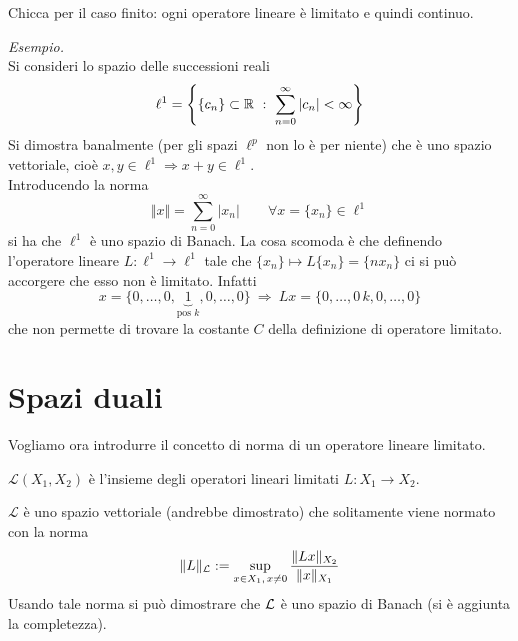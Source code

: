 Chicca per il caso finito: ogni operatore lineare è limitato e quindi continuo.

\textit{Esempio.}\\
Si consideri lo spazio delle successioni reali
\begin{equation*}
\ell^1=\left\{ \{c_n\}\subset \RR \ :\ \sum_{n=0}^{\infty}|c_n|<\infty\right\}
\end{equation*}
Si dimostra banalmente (per gli spazi $\ell^p$ non lo è per niente) che è uno spazio vettoriale, cioè $x,y\in\ell^1\Rightarrow x+y\in\ell^1$. \\
Introducendo la norma
\begin{equation*}
\Vert x \Vert =\sum_{n=0}^\infty |x_n| \qquad \forall x=\{x_n\}\in\ell^1
\end{equation*}
si ha che $\ell^1$ è uno spazio di Banach. La cosa scomoda è che definendo l'operatore lineare $L:\ell^1\to\ell^1$ tale che $\{x_n\}\mapsto L\{x_n\}=\{nx_n\}$ ci si può accorgere che esso non è limitato. Infatti
\begin{equation*}
x=\{0,\dots,0,\underbrace{1}_{\text{pos }k},0,\dots,0\}\ \Rightarrow\ Lx=\{0,\dots,0\,k,0,\dots,0\}
\end{equation*}
che non permette di trovare la costante $C$ della definizione di operatore limitato.

\section{Spazi duali}

Vogliamo ora introdurre il concetto di norma di un operatore lineare limitato.

\begin{defn}
$\mathcal{L}(X_1,X_2)$ è l'insieme degli operatori lineari limitati $L:X_1\to X_2$.
\end{defn}

$\mathcal{L}$ è uno spazio vettoriale (andrebbe dimostrato) che solitamente viene normato con la norma
\begin{equation*}
\Vert L \Vert_{\mathcal{L}} := \sup_{x\in X_1,\,x\neq 0} \frac{\Vert Lx \Vert_{X_2}}{\Vert x\Vert_{X_1}}
\end{equation*}
Usando tale norma si può dimostrare che $\mathcal{L}$ è uno spazio di Banach (si è aggiunta la completezza).

